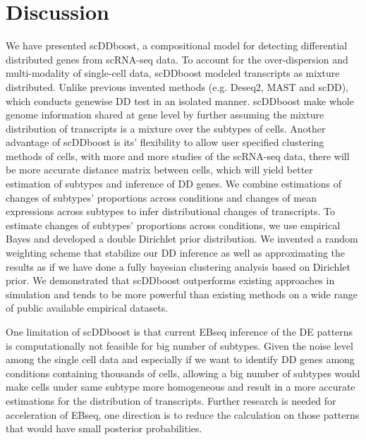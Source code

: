 \documentclass[aoas,preprint]{imsart}
\begin{document}
\section{Discussion}
We have presented scDDboost, a compositional model for detecting differential distributed genes from scRNA-seq data. To account for the over-dispersion and multi-modality of single-cell data, scDDboost modeled transcripts as mixture distributed. Unlike previous invented methods (e.g. Deseq2, MAST and scDD), which conducts genewise DD test in an isolated manner. scDDboost make whole genome information shared at gene level by further assuming the mixture distribution of transcripts is a mixture over the subtypes of cells. Another advantage of scDDboost is its' flexibility to allow user specified clustering methods of cells, with more and more studies of the scRNA-seq data, there will be more accurate distance matrix between cells, which will yield better estimation of subtypes and inference of DD genes. We combine estimations of changes of subtypes' proportions across conditions and changes of mean expressions across subtypes to infer distributional changes of transcripts. To estimate changes of subtypes' proportions across conditions, we use empirical Bayes and developed a double Dirichlet prior distribution.  We invented a random weighting scheme that stabilize our DD inference as well as approximating the results as if we have done a fully bayesian clustering analysis based on Dirichlet prior.  We demonstrated that scDDboost outperforms existing approaches in simulation and tends to be more powerful than existing methods on a wide range of public available empirical datasets. 

One limitation of scDDboost is that current EBseq inference of the DE patterns is computationally not feasible for big number of subtypes. Given the noise level among the single cell data and especially if we want to identify DD genes among conditions containing thousands of cells, allowing a big number of subtypes would make cells under same subtype more homogeneous and result in a more accurate estimations for the distribution of transcripts. Further research is needed for acceleration of EBseq, one direction is to reduce the calculation on those patterns that would have small posterior probabilities. 




%



\newpage
\end{document}

